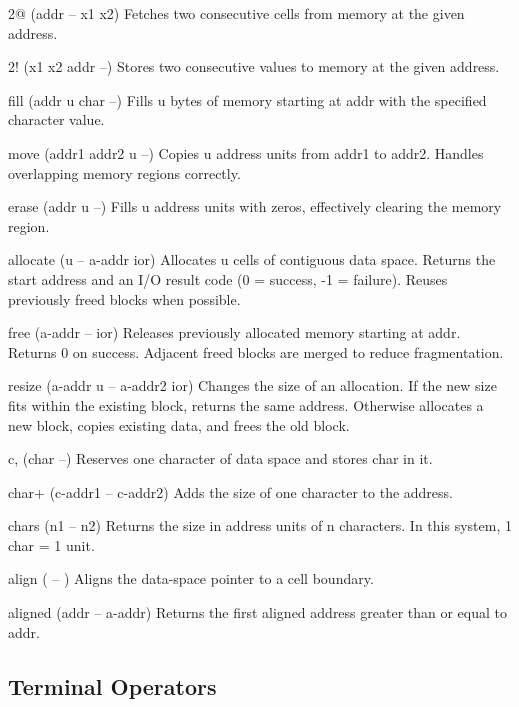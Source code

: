 \documentclass[a4paper, 11pt, openany]{book}
\begin{document}
\begin{forthbox}
  2@       (addr -- x1 x2)
           Fetches two consecutive cells from memory at the given
           address.

  2!       (x1 x2 addr --)
           Stores two consecutive values to memory at the given
           address.

  fill     (addr u char --)
           Fills u bytes of memory starting at addr with the
           specified character value.

  move     (addr1 addr2 u --)
           Copies u address units from addr1 to addr2. Handles
           overlapping memory regions correctly.

  erase    (addr u --)
           Fills u address units with zeros, effectively clearing
           the memory region.

  allocate (u -- a-addr ior)
           Allocates u cells of contiguous data space. Returns the
           start address and an I/O result code (0 = success, -1 =
           failure). Reuses previously freed blocks when possible.

  free     (a-addr -- ior)
           Releases previously allocated memory starting at addr.
           Returns 0 on success. Adjacent freed blocks are merged
           to reduce fragmentation.

  resize   (a-addr u -- a-addr2 ior)
           Changes the size of an allocation. If the new size fits
           within the existing block, returns the same address.
           Otherwise allocates a new block, copies existing data,
           and frees the old block.

  c,       (char --)
           Reserves one character of data space and stores char
           in it.

  char+    (c-addr1 -- c-addr2)
           Adds the size of one character to the address.

  chars    (n1 -- n2)
           Returns the size in address units of n characters.
           In this system, 1 char = 1 unit.

  align    ( -- )
           Aligns the data-space pointer to a cell boundary.

  aligned  (addr -- a-addr)
           Returns the first aligned address greater than or
           equal to addr.
\end{forthbox}

\subsection{Terminal Operators}
\end{document}
